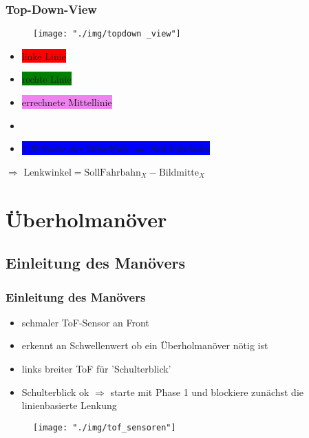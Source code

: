 \documentclass{beamer}
\begin{document}
	\begin{frame}
		\frametitle{Top-Down-View}
		\begin{center}
			\begin{figure}[h]
				\texttt{[image: "./img/topdown \_view"]}
				\label{fig:topdown}
			\end{figure}
		\end{center}

		\begin{itemize}
			\item \colorbox{red}{linke Linie}
			\item \colorbox{green}{rechte Linie}
			\item \colorbox{violet}{errechnete Mittellinie}
			\item \colorbox{white}{\color{black}{Bildmitte $	\Leftrightarrow$ Automitte}}
			\item \colorbox{blue}{1.25-Fache der Mittellinie $\Rightarrow$ Soll-Fahrbahn}
		\end{itemize}
	$\Rightarrow$ $\text{Lenkwinkel} = \text{SollFahrbahn}_X - \text{Bildmitte}_X$
	\end{frame}
	
	
	\section{Überholmanöver}
	
	\subsection{Einleitung des Manövers}
	
	\begin{frame}
		\frametitle{Einleitung des Manövers}
		\begin{itemize}
			\item schmaler ToF-Sensor an Front
			\item erkennt an Schwellenwert ob ein Überholmanöver nötig ist
			\item links breiter ToF für 'Schulterblick'
			\item Schulterblick ok $\Rightarrow$ starte mit Phase 1 und blockiere zunächst die linienbasierte Lenkung
		\end{itemize}
		\begin{center}
			\begin{figure}[h]
				\texttt{[image: "./img/tof\_sensoren"]}
				\label{fig:topdown}
			\end{figure}
		\end{center}
	\end{frame}
	
\end{document}
